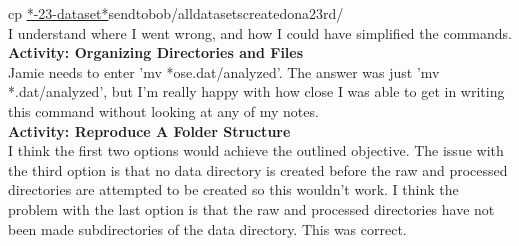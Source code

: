 \documentclass{article}
\begin{document}
\begin{FlushLeft}
cp \underline{*-23-dataset*}send\textunderscore to\textunderscore bob/all\textunderscore datasets\textunderscore created\textunderscore on\textunderscore a\textunderscore 23rd/\\
I understand where I went wrong, and how I could have simplified the commands.\\
\vspace{5mm}
\textbf{Activity: Organizing Directories and Files}\\
Jamie needs to enter 'mv *ose.dat/analyzed'. The answer was just 'mv *.dat/analyzed', but I'm really happy with how close I was able to get in writing this command without looking at any of my notes.\\
\vspace{5mm}
\textbf{Activity: Reproduce A Folder Structure}\\
I think the first two options would achieve the outlined objective. The issue with the third option is that no data directory is created before the raw and processed directories are attempted to be created so this wouldn't work. I think the problem with the last option is that the raw and processed directories have not been made subdirectories of the data directory. This was correct.\\


\end{FlushLeft}
\end{document}
